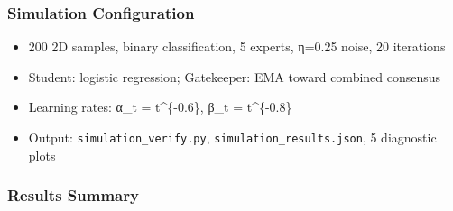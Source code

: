 \documentclass[
  12pt,
]{ctexart}
\providecommand{\tightlist}{%
  \setlength{\itemsep}{0pt}\setlength{\parskip}{0pt}}
\begin{document}
\subsubsection{Simulation Configuration}\label{simulation-configuration}

\begin{itemize}
\tightlist
\item
  200 2D samples, binary classification, 5 experts, η=0.25 noise, 20
  iterations
\item
  Student: logistic regression; Gatekeeper: EMA toward combined
  consensus
\item
  Learning rates: α\_t = t\^{}\{-0.6\}, β\_t = t\^{}\{-0.8\}
\item
  Output: \texttt{simulation\_verify.py},
  \texttt{simulation\_results.json}, 5 diagnostic plots
\end{itemize}

\subsubsection{Results Summary}\label{results-summary}
\end{document}
